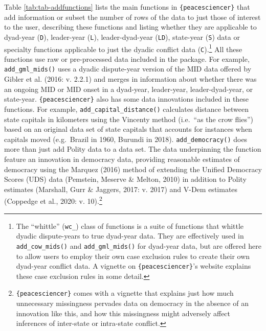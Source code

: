 \documentclass[
  11pt,
]{article}
\begin{document}
Table \ref{tab:tab-addfunctions} lists the main functions in \texttt{\{peacesciencer\}} that add information or subset the number of rows of the data to just those of interest to the user, describing these functions and listing whether they are applicable to dyad-year (\texttt{D}), leader-year (\texttt{L}), leader-dyad-year (\texttt{LD}), state-year (\texttt{S}) data or specialty functions applicable to just the dyadic conflict data (\texttt{C}).\footnote{The ``whittle'' (\texttt{wc\_}) class of functions is a suite of functions that whittle dyadic dispute-years to true dyad-year data. They are effectively used in \texttt{add\_cow\_mids()} and \texttt{add\_gml\_mids()} for dyad-year data, but are offered here to allow users to employ their own case exclusion rules to create their own dyad-year conflict data. A vignette on \texttt{\{peacesciencer\}}'s website explains these case exclusion rules in some detail.} All these functions use raw or pre-processed data included in the package. For example, \texttt{add\_gml\_mids()} uses a dyadic dispute-year version of the MID data offered by Gibler et al. (2016: v. 2.2.1) and merges in information about whether there was an ongoing MID or MID onset in a dyad-year, leader-year, leader-dyad-year, or state-year. \texttt{\{peacesciencer\}} also has some data innovations included in these functions. For example, \texttt{add\_capital\_distance()} calculates distance between state capitals in kilometers using the Vincenty method (i.e.~``as the crow flies'') based on an original data set of state capitals that accounts for instances when capitals moved (e.g.~Brazil in 1960, Burundi in 2018). \texttt{add\_democracy()} does more than just add Polity data to a data set. The data underpinning the function feature an innovation in democracy data, providing reasonable estimates of democracy using the Marquez (2016) method of extending the Unified Democracy Scores (UDS) data (Pemstein, Meserve \& Melton, 2010) in addition to Polity estimates (Marshall, Gurr \& Jaggers, 2017: v. 2017) and V-Dem estimates (Coppedge et al., 2020: v. 10).\footnote{\texttt{\{peacesciencer\}} comes with a vignette that explains just how much unnecessary missingness pervades data on democracy in the absence of an innovation like this, and how this missingness might adversely affect inferences of inter-state or intra-state conflict.}

\begingroup\fontsize{9}{11}\selectfont
\end{document}
